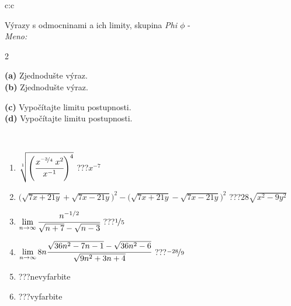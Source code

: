 \documentclass[10pt]{report}
\begin{document}
\begin{tabular}{c:c}
\begin{minipage}[c][104.5mm][t]{0.5\linewidth}
\begin{center}
\vspace{7mm}
{\huge {\Large Výrazy s odmocninami a ich limity}, skupina \textit{Phi $\phi$} -}\\[5mm]
\textit{Meno:}\phantom{xxxxxxxxxxxxxxxxxxxxxxxxxxxxxxxxxxxxxxxxxxxxxxxxxxxxxxxxxxxxxxxxx}\\[5mm]
\begin{minipage}{0.95\linewidth}
\begin{center}
{\small \begin{multicols}{2} \raggedright
\phantom{xxxxxxxxx}\textbf{(a)} Zjednodušte výraz. \\[1mm]
\phantom{xxxxxxxxx}\textbf{(b)} Zjednodušte výraz. \par \columnbreak
\textbf{(c)} Vypočítajte limitu postupnosti. \\[1mm]
\textbf{(d)} Vypočítajte limitu postupnosti.
\end{multicols}
}
\end{center}
\end{minipage}
\\[4mm]
\begin{minipage}{0.79\linewidth}
\begin{center}
\begin{varwidth}{\linewidth}
\begin{enumerate}
\small
\item $\sqrt[1]{\left(\cfrac{x^{\nicefrac{-3}{4}}\;x^{2}}{x^{-1}}\right)^{4}}$\quad \dotfill\; ???\;\dotfill \quad $x^{-7}$
\item {\footnotesize{\scriptsize$\big(\sqrt{7x+21y}+\sqrt{7x-21y}\big)^2-\big(\sqrt{7x+21y}-\sqrt{7x-21y}\big)^2$}\quad \dotfill\; ???\;\dotfill \quad $28\sqrt{x^2-9y^2}$}
\item $\lim\limits_{n\to\infty}\cfrac{n^{-1/2}}{\sqrt{n+7}-\sqrt{n-3}}$\quad \dotfill\; ???\;\dotfill \quad $\nicefrac{1}{5}$
\item $\lim\limits_{n\to\infty}8n\cfrac{\sqrt{36n^2-7n-1}-\sqrt{36n^2-6}}{\sqrt{9n^2+3n+4}}$\quad \dotfill\; ???\;\dotfill \quad $\nicefrac{-28}{9}$
\item \quad \dotfill\; ???\;\dotfill \quad nevyfarbite
\item \quad \dotfill\; ???\;\dotfill \quad vyfarbite
\end{enumerate}
\end{varwidth}
\end{center}

\end{minipage}
\end{center}
\end{minipage}
\end{tabular}
\end{document}
